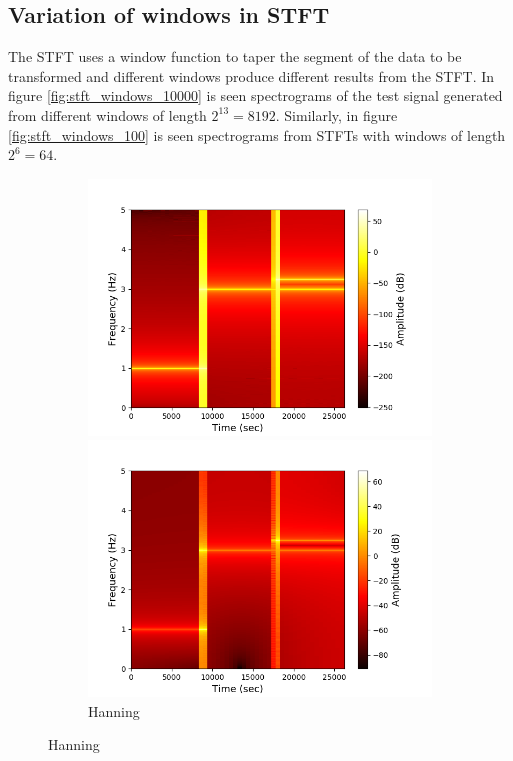 \subsection{Variation of windows in STFT}
The STFT uses a window function to taper the segment of the data to be transformed and different windows produce different results from the STFT. In figure \ref{fig:stft_windows_10000} is seen spectrograms of the test signal generated from different windows of length $2^{13}=8192$. Similarly, in figure \ref{fig:stft_windows_100} is seen spectrograms from STFTs with windows of length $2^6=64$.
\begin{figure}[H]
\centering
\begin{subfigure}{0.49\textwidth}
\centering
\includegraphics[width=\textwidth]{figures/stft_windows/hanning_10000.png}
\caption{Hanning}
\label{fig:stft_hanning}
\includegraphics[width=\textwidth]{figures/stft_windows/hamming_10000.png}

\end{subfigure}
\end{figure}
